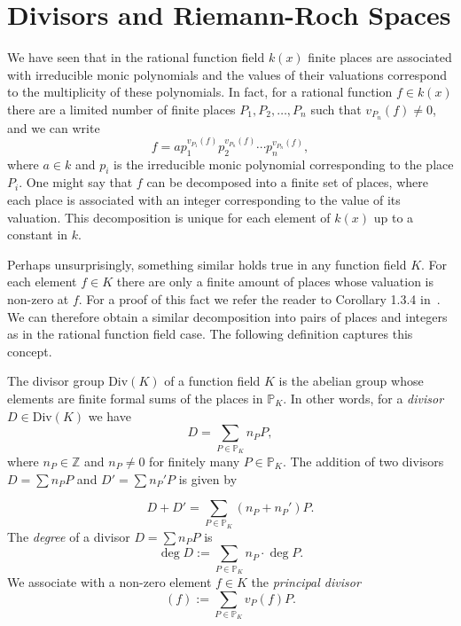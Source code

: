 \section{Divisors and Riemann-Roch Spaces}%
\label{sec:divisors-and-riemann-roch-spaces}

We have seen that in the rational function field \(k(x)\) finite places are associated with irreducible monic polynomials and the values of their valuations correspond to the multiplicity of these polynomials. In fact, for a rational function \(f \in k(x)\) there are a limited number of finite places \(P_{1}, P_{2}, \dots, P_{n}\) such that \(v_{P_{n}}(f) \neq 0\), and we can write
\[f = a p_{1}^{v_{P_{1}}(f)} p_{2}^{v_{P_{n}}(f)} \cdots p_{n}^{v_{P_{n}}(f)},\]
where \(a \in k\) and \(p_{i}\) is the irreducible monic polynomial corresponding to the place \(P_{i}\). One might say that \(f\) can be decomposed into a finite set of places, where each place is associated with an integer corresponding to the value of its valuation. This decomposition is unique for each element of \(k(x)\) up to a constant in \(k\).

Perhaps unsurprisingly, something similar holds true in any function field \(K\). For each element \(f \in K\) there are only a finite amount of places whose valuation is non-zero at \(f\). For a proof of this fact we refer the reader to Corollary 1.3.4 in~\cite{stichtenoth-2009-algebraic-function-fields}. We can therefore obtain a similar decomposition into pairs of places and integers as in the rational function field case. The following definition captures this concept.

\begin{definition}%
  \label{def:divisor}
  The divisor group \(\mathrm{Div}(K)\) of a function field \(K\) is the abelian group whose elements are finite formal sums of the places in \(\mathbb{P}_{K}\). In other words, for a \textit{divisor} \(D \in \mathrm{Div}(K)\) we have
  \[D = \sum_{P \in \mathbb{P}_{K}} n_{P} P,\]
  where \(n_{P} \in \mathbb{Z}\) and \(n_{P} \neq 0\) for finitely many \(P \in \mathbb{P}_{K}\). The addition of two divisors \({D = \sum n_{P}P}\) and \({D' = \sum n_{P}'P}\) is given by

  \[D + D' = \sum_{P \in \mathbb{P}_{K}} \left( n_{P} + n_{P}' \right) P.\]
  The \textit{degree} of a divisor \({D = \sum n_{P}P}\) is
  \[\deg{D} := \sum_{P \in \mathbb{P}_{K}} n_{P} \cdot \deg{P}.\]
  We associate with a non-zero element \(f \in K\) the \textit{principal divisor}
  \[(f) := \sum_{P \in \mathbb{P}_{K}} v_{P}(f) P.\]
\end{definition}

